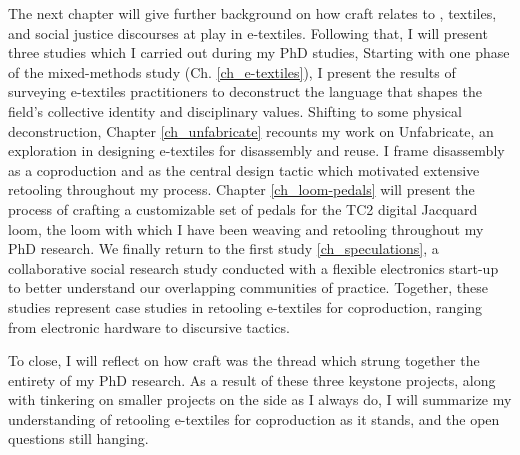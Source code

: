 The next chapter will give further background on how craft relates to , textiles, and social justice discourses at play in e-textiles. Following that, I will present three studies which I carried out during my PhD studies, 
Starting with one phase of the mixed-methods study (Ch. \ref{ch_e-textiles}), I present the results of surveying e-textiles practitioners to deconstruct the language that shapes the field's collective identity and disciplinary values. Shifting to some physical deconstruction, Chapter \ref{ch_unfabricate} recounts my work on Unfabricate, an exploration in designing e-textiles for disassembly and reuse. I frame disassembly as a coproduction and as the central design tactic which motivated extensive retooling throughout my process. Chapter \ref{ch_loom-pedals} will present the process of crafting a customizable set of pedals for the TC2 digital Jacquard loom, the loom with which I have been weaving and retooling throughout my PhD research. We finally return to the first study \ref{ch_speculations}, a collaborative social research study conducted with a flexible electronics start-up to better understand our overlapping communities of practice. Together, these studies represent case studies in retooling e-textiles for coproduction, ranging from electronic hardware to discursive tactics.

To close, I will reflect on how craft was the thread which strung together the entirety of my PhD research. As a result of these three keystone projects, along with tinkering on smaller projects on the side as I always do, I will summarize my understanding of retooling e-textiles for coproduction as it stands, and the open questions still hanging.



